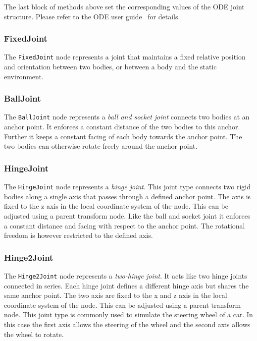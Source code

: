 The last block of methods above set the corresponding values of the
ODE joint structure. Please refer to the ODE user guide~\cite{Smi04}
for details.

\subsubsection{FixedJoint}

The \texttt{FixedJoint} node represents a joint that maintains a fixed
relative position and orientation between two bodies, or between a
body and the static environment. 

\subsubsection{BallJoint}

The \texttt{BallJoint} node represents a \emph{ball and socket joint}
connects two bodies at an anchor point. It enforces a constant
distance of the two bodies to this anchor. Further it keeps a constant
facing of each body towards the anchor point. The two bodies can
otherwise rotate freely around the anchor point.

\subsubsection{HingeJoint}

The \texttt{HingeJoint} node represents a \emph{hinge joint}. This
joint type connects two rigid bodies along a single axis that passes
through a defined anchor point. The axis is fixed to the z axis in the
local coordinate system of the node. This can be adjusted using a
parent transform node. Like the ball and socket joint it enforces a
constant distance and facing with respect to the anchor point. The
rotational freedom is however restricted to the defined axis.

\subsubsection{Hinge2Joint}

The \texttt{Hinge2Joint} node represents a \emph{two-hinge joint}. It
acts like two hinge joints connected in series.  Each hinge joint
defines a different hinge axis but shares the same anchor point. The
two axis are fixed to the x and z axis in the local coordinate system
of the node. This can be adjusted using a parent transform node. This
joint type is commonly used to simulate the steering wheel of a car.
In this case the first axis allows the steering of the wheel and the
second axis allows the wheel to rotate.

